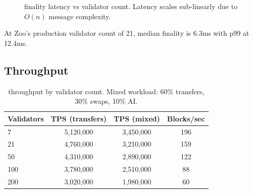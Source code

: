 \begin{figure}[t]
\centering
{}
\caption{\Quasar{} finality latency vs validator count. Latency scales sub-linearly due to $O(n)$ message complexity.}
\label{fig:finality}
\end{figure}

At Zoo's production validator count of 21, median finality is 6.3ms with p99 at 12.4ms.

\subsection{Throughput}

\begin{table}[t]
\centering
\begin{tabular}{lccc}
\toprule
\textbf{Validators} & \textbf{TPS (transfers)} & \textbf{TPS (mixed)} & \textbf{Blocks/sec} \\
\midrule
7 & 5,120,000 & 3,450,000 & 196 \\
21 & 4,760,000 & 3,210,000 & 159 \\
50 & 4,310,000 & 2,890,000 & 122 \\
100 & 3,780,000 & 2,510,000 & 88 \\
200 & 3,020,000 & 1,980,000 & 60 \\
\bottomrule
\end{tabular}
\caption{\Quasar{} throughput by validator count. Mixed workload: 60\% transfers, 30\% swaps, 10\% AI.}
\label{tab:throughput}
\end{table}

